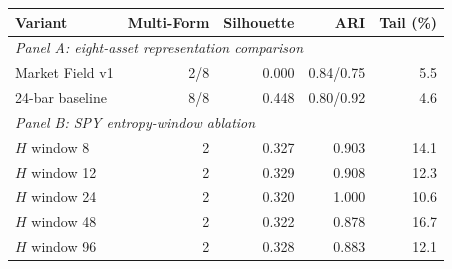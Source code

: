 \begin{tabular}{lrrrr}
\toprule
Variant & Multi-Form & Silhouette & ARI & Tail (\%) \\
\midrule
\multicolumn{5}{l}{\emph{Panel A: eight-asset representation comparison}} \\
Market Field v1 & 2/8 & 0.000 & 0.84/0.75 & 5.5 \\
24-bar baseline & 8/8 & 0.448 & 0.80/0.92 & 4.6 \\
\midrule
\multicolumn{5}{l}{\emph{Panel B: SPY entropy-window ablation}} \\
$H$ window 8 & 2 & 0.327 & 0.903 & 14.1 \\
$H$ window 12 & 2 & 0.329 & 0.908 & 12.3 \\
$H$ window 24 & 2 & 0.320 & 1.000 & 10.6 \\
$H$ window 48 & 2 & 0.322 & 0.878 & 16.7 \\
$H$ window 96 & 2 & 0.328 & 0.883 & 12.1 \\
\bottomrule
\end{tabular}
